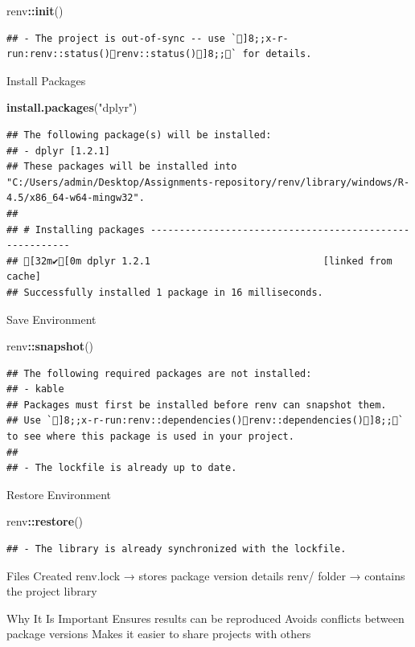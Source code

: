 \documentclass[
]{article}
\newenvironment{Shaded}{\begin{snugshade}}{\end{snugshade}}
\newcommand{\FunctionTok}[1]{\textcolor[rgb]{0.13,0.29,0.53}{\textbf{#1}}}
\newcommand{\NormalTok}[1]{#1}
\newcommand{\SpecialCharTok}[1]{\textcolor[rgb]{0.81,0.36,0.00}{\textbf{#1}}}
\newcommand{\StringTok}[1]{\textcolor[rgb]{0.31,0.60,0.02}{#1}}
\begin{document}
\begin{Shaded}
\begin{Highlighting}[]
\NormalTok{renv}\SpecialCharTok{::}\FunctionTok{init}\NormalTok{()}
\end{Highlighting}
\end{Shaded}

\begin{verbatim}
## - The project is out-of-sync -- use `]8;;x-r-run:renv::status()renv::status()]8;;` for details.
\end{verbatim}

Install Packages

\begin{Shaded}
\begin{Highlighting}[]
\FunctionTok{install.packages}\NormalTok{(}\StringTok{"dplyr"}\NormalTok{)}
\end{Highlighting}
\end{Shaded}

\begin{verbatim}
## The following package(s) will be installed:
## - dplyr [1.2.1]
## These packages will be installed into "C:/Users/admin/Desktop/Assignments-repository/renv/library/windows/R-4.5/x86_64-w64-mingw32".
## 
## # Installing packages --------------------------------------------------------
## [32m✔[0m dplyr 1.2.1                              [linked from cache]
## Successfully installed 1 package in 16 milliseconds.
\end{verbatim}

Save Environment

\begin{Shaded}
\begin{Highlighting}[]
\NormalTok{renv}\SpecialCharTok{::}\FunctionTok{snapshot}\NormalTok{()}
\end{Highlighting}
\end{Shaded}

\begin{verbatim}
## The following required packages are not installed:
## - kable
## Packages must first be installed before renv can snapshot them.
## Use `]8;;x-r-run:renv::dependencies()renv::dependencies()]8;;` to see where this package is used in your project.
## 
## - The lockfile is already up to date.
\end{verbatim}

Restore Environment

\begin{Shaded}
\begin{Highlighting}[]
\NormalTok{renv}\SpecialCharTok{::}\FunctionTok{restore}\NormalTok{()}
\end{Highlighting}
\end{Shaded}

\begin{verbatim}
## - The library is already synchronized with the lockfile.
\end{verbatim}

Files Created renv.lock → stores package version details renv/ folder →
contains the project library

Why It Is Important Ensures results can be reproduced Avoids conflicts
between package versions Makes it easier to share projects with others
\end{document}
